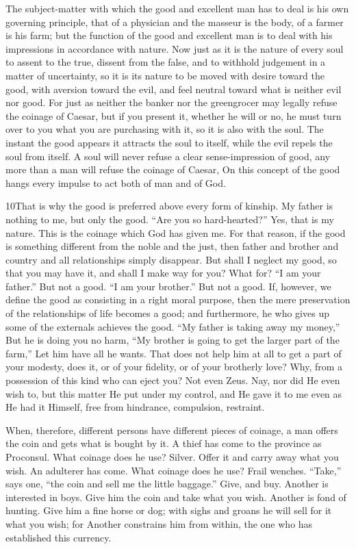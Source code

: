 The subject-matter with which the good and excellent man has to deal is his own governing principle, that of a physician and the masseur is the body, of a farmer is his farm; but the function of the good and excellent man is to deal with his impressions in accordance with nature. Now just as it is the nature of every soul to assent to the true, dissent from the false, and to withhold judgement in a matter of uncertainty, so it is its nature to be moved with desire toward the good, with aversion toward the evil, and feel neutral toward what is neither evil nor good. For just as neither the banker nor the greengrocer may legally refuse the coinage of Caesar, but if you present it, whether he will or no, he must turn over to you what you are purchasing with it, so it is also with the soul. The instant the good appears it attracts the soul to itself, while the evil repels the soul from itself. A soul will never refuse a clear sense-impression of good, any more than a man will refuse the coinage of Caesar, On this concept of the good hangs every impulse to act both of man and of God.

10That is why the good is preferred above every form of kinship. My father is nothing to me, but only the good. ``Are you so hard-hearted?'' Yes, that is my nature. This is the coinage which God has given me. For that reason, if the good is something different from the noble and the just, then father and brother and country and all relationships simply disappear. But shall I neglect my good, so that you may have it, and shall I make way for you? What for? ``I am your father.'' But not a good. ``I am your brother.'' But not a good. If, however, we define the good as consisting in a right moral purpose, then the mere preservation of the relationships of life becomes a good; and furthermore, he who gives up some of the externals achieves the good. ``My father is taking away my money,'' But he is doing you no harm, ``My brother is going to get the larger part of the farm,'' Let him have all he wants. That does not help him at all to get a part of your modesty, does it, or of your fidelity, or of your brotherly love? Why, from a possession of this kind who can eject you? Not even Zeus. Nay, nor did He even wish to, but this matter He put under my control, and He gave it to me even as He had it Himself, free from hindrance, compulsion, restraint.

When, therefore, different persons have different pieces of coinage, a man offers the coin and gets what is bought by it. A thief has come to the province as Proconsul. What coinage does he use? Silver. Offer it and carry away what you wish. An adulterer has come. What coinage does he use? Frail wenches. ``Take,'' says one, ``the coin and sell me the little baggage.'' Give, and buy. Another is interested in boys. Give him the coin and take what you wish. Another is fond of hunting. Give him a fine horse or dog; with sighs and groans he will sell for it what you wish; for Another constrains him from within, the one who has established this currency.


